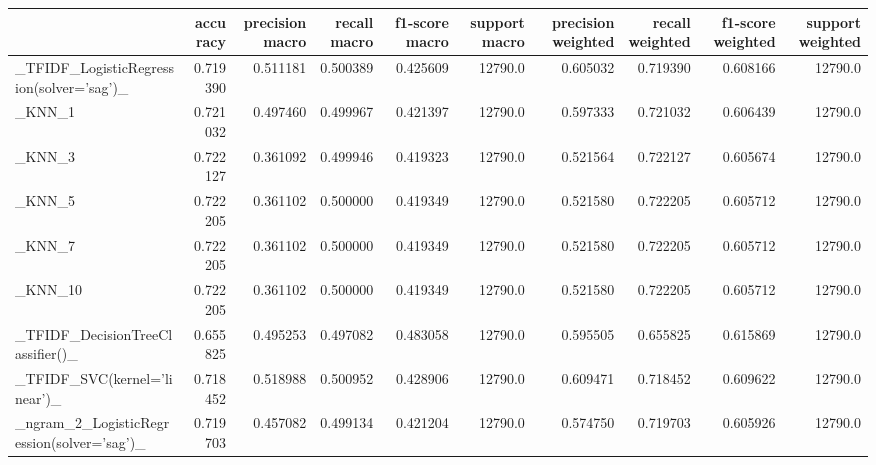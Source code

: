 \begin{tabular}{lrrrrrrrrr}
\toprule
{} &  accuracy &  precision macro &  recall macro &  f1-score macro &  support macro &  precision weighted &  recall weighted &  f1-score weighted &  support weighted \\
\midrule
\_TFIDF\_LogisticRegression(solver='sag')\_           &  0.719390 &         0.511181 &      0.500389 &        0.425609 &        12790.0 &            0.605032 &         0.719390 &           0.608166 &           12790.0 \\
\_KNN\_1                                             &  0.721032 &         0.497460 &      0.499967 &        0.421397 &        12790.0 &            0.597333 &         0.721032 &           0.606439 &           12790.0 \\
\_KNN\_3                                             &  0.722127 &         0.361092 &      0.499946 &        0.419323 &        12790.0 &            0.521564 &         0.722127 &           0.605674 &           12790.0 \\
\_KNN\_5                                             &  0.722205 &         0.361102 &      0.500000 &        0.419349 &        12790.0 &            0.521580 &         0.722205 &           0.605712 &           12790.0 \\
\_KNN\_7                                             &  0.722205 &         0.361102 &      0.500000 &        0.419349 &        12790.0 &            0.521580 &         0.722205 &           0.605712 &           12790.0 \\
\_KNN\_10                                            &  0.722205 &         0.361102 &      0.500000 &        0.419349 &        12790.0 &            0.521580 &         0.722205 &           0.605712 &           12790.0 \\
\_TFIDF\_DecisionTreeClassifier()\_                   &  0.655825 &         0.495253 &      0.497082 &        0.483058 &        12790.0 &            0.595505 &         0.655825 &           0.615869 &           12790.0 \\
\_TFIDF\_SVC(kernel='linear')\_                       &  0.718452 &         0.518988 &      0.500952 &        0.428906 &        12790.0 &            0.609471 &         0.718452 &           0.609622 &           12790.0 \\
\_ngram\_2\_LogisticRegression(solver='sag')\_         &  0.719703 &         0.457082 &      0.499134 &        0.421204 &        12790.0 &            0.574750 &         0.719703 &           0.605926 &           12790.0 \\

\end{tabular}
